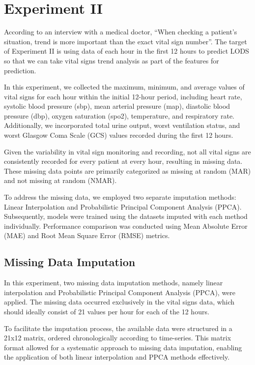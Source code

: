 \documentclass[12pt,a4paper,english
]{tunithesis}
\begin{document}
\section{Experiment II}

According to an interview with a medical doctor, \enquote{When checking a patient's situation, trend is more important than the exact vital sign number}. The target of Experiment II is using data of each hour in the first 12 hours to predict LODS so that we can take vital signs trend analysis as part of the features for prediction.

In this experiment, we collected the maximum, minimum, and average values of vital signs for each hour within the initial 12-hour period, including heart rate, systolic blood pressure (sbp), mean arterial pressure (map), diastolic blood pressure (dbp), oxygen saturation (spo2), temperature, and respiratory rate. Additionally, we incorporated total urine output, worst ventilation status, and worst Glasgow Coma Scale (GCS) values recorded during the first 12 hours.

Given the variability in vital sign monitoring and recording, not all vital signs are consistently recorded for every patient at every hour, resulting in missing data. These missing data points are primarily categorized as missing at random (MAR) and not missing at random (NMAR).

To address the missing data, we employed two separate imputation methods: Linear Interpolation and Probabilistic Principal Component Analysis (PPCA). Subsequently, models were trained using the datasets imputed with each method individually. Performance comparison was conducted using Mean Absolute Error (MAE) and Root Mean Square Error (RMSE) metrics.

\subsection{Missing Data Imputation}

In this experiment, two missing data imputation methods, namely linear interpolation and Probabilistic Principal Component Analysis (PPCA), were applied. The missing data occurred exclusively in the vital signs data, which should ideally consist of 21 values per hour for each of the 12 hours.

To facilitate the imputation process, the available data were structured in a 21x12 matrix, ordered chronologically according to time-series. This matrix format allowed for a systematic approach to missing data imputation, enabling the application of both linear interpolation and PPCA methods effectively.
\end{document}
